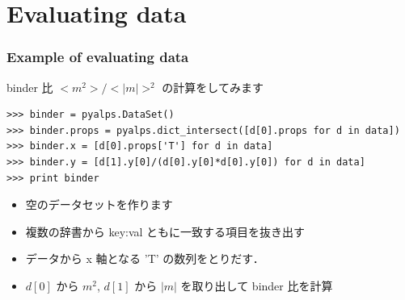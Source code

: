 \section{Evaluating data}
\begin{frame}[t,fragile]
\frametitle{Example of evaluating data}
binder 比 $<m^2>/<|m|>^2$ の計算をしてみます
\begin{lstlisting}
>>> binder = pyalps.DataSet()
>>> binder.props = pyalps.dict_intersect([d[0].props for d in data])
>>> binder.x = [d[0].props['T'] for d in data]
>>> binder.y = [d[1].y[0]/(d[0].y[0]*d[0].y[0]) for d in data]
>>> print binder
\end{lstlisting}
\begin{itemize}
\item 空のデータセットを作ります
\item 複数の辞書から key:val ともに一致する項目を抜き出す
\item データから x 軸となる 'T' の数列をとりだす．
\item $d[0]$ から $m^2$, $d[1]$ から $|m|$ を取り出して binder 比を計算
\end{itemize}
\end{frame}


